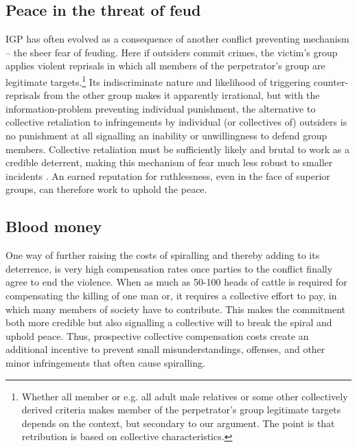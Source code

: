 \documentclass[12pt]{article}
\begin{document}
\subsection{Peace in the threat of feud}

IGP has often evolved as a consequence of another conflict preventing mechanism
– the sheer fear of feuding. Here if outsiders commit crimes, the victim’s group
applies violent reprisals in which all members of the perpetrator’s group are
legitimate targets.\footnote{ Whether all member or e.g. all adult male
	relatives or some other collectively derived criteria makes member of
	the perpetrator’s group legitimate targets depends on the context, but
secondary to our argument. The point is that retribution is based on collective
characteristics.} Its indiscriminate nature and likelihood of triggering
counter-reprisals from the other group makes it apparently irrational, but with
the information-problem preventing individual punishment, the alternative to
collective retaliation to infringements by individual (or collectives of)
outsiders is no punishment at all signalling an inability or unwillingness to
defend group members. Collective retaliation must be sufficiently likely and
brutal to work as a credible deterrent, making this mechanism of fear much less
robust to smaller incidents \citep{Fearon_1996}. An earned reputation for
ruthlessness, even in the face of superior groups, can therefore work to uphold
the peace.


\subsection{Blood money}

One way of further raising the costs of spiralling and thereby adding to its
deterrence, is very high compensation rates once parties to the conflict finally
agree to end the violence. When as much as 50-100 heads of cattle is required
for compensating the killing of one man 
or, 
it requires a collective effort to pay, in which many members of society have to
contribute. This makes the commitment both more credible but also signalling a
collective will to break the spiral and uphold peace. Thus, prospective
collective compensation costs create an additional incentive to prevent small
misunderstandings, offenses, and other minor infringements that often cause
spiralling.
\end{document}
